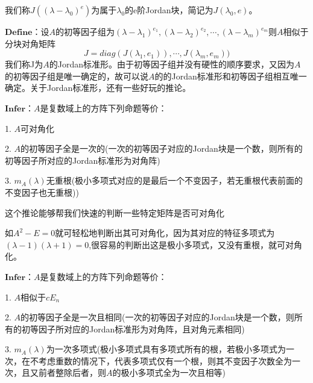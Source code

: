 \documentclass[a4paper,12pt]{book}
\begin{document}
我们称$J((\lambda-\lambda_{0})^{e})$为属于$\lambda_{0}$的e阶Jordan块，简记为$J(\lambda_{0},e)$。

$\mathbf{Define}$：设$\mathit{A}$的初等因子组为$(\lambda-\lambda_{1})^{e_{1}},(\lambda-\lambda_{2})^{e_{2}},\cdots,(\lambda-\lambda_{m})^{e_{m}}$则$\mathit{A}$相似于分块对角矩阵
\begin{equation*}
	J=diag(J(\lambda_{1},e_{1})),\cdots,J(\lambda_{m},e_{m}))
\end{equation*}
我们称J为$\mathit{A}$的Jordan标准形。由于初等因子组并没有硬性的顺序要求，又因为$\mathit{A}$的初等因子组是唯一确定的，故可以说$\mathit{A}$的的Jordan标准形和初等因子组相互唯一确定。关于Jordan标准形，还有一些好玩的推论。

$\mathbf{Infer}$：$\mathit{A}$是复数域上的方阵下列命题等价：

1. $\mathit{A}$可对角化

2. $\mathit{A}$的初等因子全是一次的(一次的初等因子对应的Jordan块是一个数，则所有的初等因子所对应的Jordan标准形为对角阵)

3. $m_{A}(\lambda)$无重根(极小多项式对应的是最后一个不变因子，若无重根代表前面的不变因子也无重根))

这个推论能够帮我们快速的判断一些特定矩阵是否可对角化

如$A^{2}-E=0$就可轻松地判断出其可对角化，因为其对应的特征多项式为$(\lambda-1)(\lambda+1)=0$,很容易的判断出这是极小多项式，又没有重根，就可对角化。

$\mathbf{Infer}$：$\mathit{A}$是复数域上的方阵下列命题等价：

1. $\mathit{A}$相似于$cE_{n}$

2. $\mathit{A}$的初等因子全是一次且相同(一次的初等因子对应的Jordan块是一个数，则所有的初等因子所对应的Jordan标准形为对角阵，且对角元素相同)

3. $m_{A}(\lambda)$为一次多项式(极小多项式具有多项式所有的根，若极小多项式为一次，在不考虑重数的情况下，代表多项式仅有一个根，则其不变因子次数全为一次，且又前者整除后者，则$\mathit{A}$的极小多项式全为一次且相等)
\end{document}
